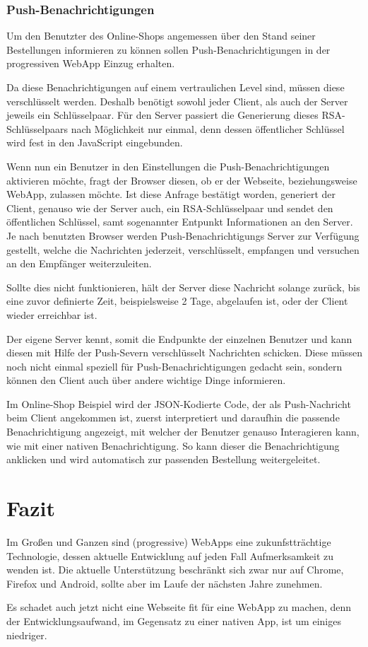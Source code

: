 \documentclass[a4paper,12pt,ngerman,listof=numbered]{scrartcl}      %
\begin{document}
	\subsubsection{Push-Benachrichtigungen}
	Um den Benutzter des Online-Shops angemessen über den Stand seiner Bestellungen informieren zu können sollen Push-Benachrichtigungen in der progres\-siven WebApp Einzug erhalten.\par
	Da diese Benachrichtigungen auf einem vertraulichen Level sind, müssen diese verschlüsselt werden. Deshalb benötigt sowohl jeder Client, als auch der Server jeweils ein Schlüsselpaar. Für den Server passiert die Generierung dieses RSA-Schlüsselpaars nach Möglichkeit nur einmal, denn dessen öffentlicher Schlüssel wird fest in den JavaScript eingebunden.\par
	Wenn nun ein Benutzer in den Einstellungen die Push-Be\-nach\-rich\-ti\-gungen aktivieren möchte, fragt der Browser diesen, ob er der Webseite, beziehungsweise WebApp, zulassen möchte. Ist diese Anfrage bestätigt worden, generiert der Client, genauso wie der Server auch, ein RSA-Schlüsselpaar und sendet den öffentlichen Schlüssel, samt sogenannter Entpunkt Informationen an den Server. Je nach benutzten Browser werden Push-Benachrichtigungs Server zur Verfügung gestellt, welche die Nachrichten jederzeit, verschlüsselt, empfangen und versuchen an den Empfänger weiterzuleiten.\par
	Sollte dies nicht funktionieren, hält der Server diese Nachricht solange zurück, bis eine zuvor definierte Zeit, beispielsweise 2 Tage, abgelaufen ist, oder der Client wieder erreichbar ist.\par
	Der eigene Server kennt, somit die Endpunkte der einzelnen Benutzer und kann diesen mit Hilfe der Push-Severn verschlüsselt Nachrichten schicken. Diese müs\-sen noch nicht einmal speziell für Push-Be\-nach\-rich\-ti\-gungen gedacht sein, sondern können den Client auch über andere wichtige Dinge informieren.\par
	Im Online-Shop Beispiel wird der JSON-Kodierte Code, der als Push-Nachricht beim Client angekommen ist, zuerst interpretiert und daraufhin die passende Benachrichtigung angezeigt, mit welcher der Benutzer genauso Interagieren kann, wie mit einer nativen Benachrichtigung. So kann dieser die Benachrichtigung an\-klicken und wird automatisch zur passenden Bestellung weitergeleitet.\par
	
	\section{Fazit}
	Im Großen und Ganzen sind (progressive) WebApps eine zukunfstträchtige Technologie, dessen aktuelle Entwicklung auf jeden Fall Aufmerksamkeit zu wenden ist. Die aktuelle Unterstützung beschränkt sich zwar nur auf Chrome, Firefox und Android, sollte aber im Laufe der nächsten Jahre zunehmen.\par
	Es schadet auch jetzt nicht eine Webseite fit für eine WebApp zu machen, denn der Entwicklungsaufwand, im Gegensatz zu einer nativen App, ist um einiges niedriger.\par
	
\end{document}
